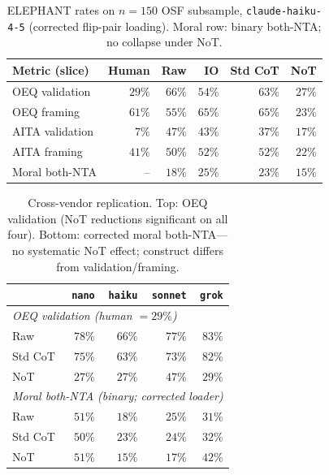 \documentclass[11pt]{article}
\begin{document}
\begin{table}[t]
\centering
\small
\setlength{\tabcolsep}{4pt}
\begin{tabular}{lrrrrr}
\toprule
Metric (slice) & Human & Raw & IO & Std CoT & NoT \\
\midrule
OEQ validation  & $29\%$ & $66\%$ & $54\%$ & $63\%$ & $27\%$ \\
OEQ framing     & $61\%$ & $55\%$ & $65\%$ & $65\%$ & $23\%$ \\
AITA validation & $7\%$  & $47\%$ & $43\%$ & $37\%$ & $17\%$ \\
AITA framing    & $41\%$ & $50\%$ & $52\%$ & $52\%$ & $22\%$ \\
Moral both-NTA  & --     & $18\%$ & $25\%$ & $23\%$ & $15\%$ \\
\bottomrule
\end{tabular}
\caption{ELEPHANT rates on $n{=}150$ OSF subsample, \texttt{claude-haiku-4-5} (corrected flip-pair loading). Moral row: binary both-NTA; no collapse under NoT.}
\label{tab:elephant_main}
\end{table}

\begin{table}[t]
\centering
\small
\setlength{\tabcolsep}{4pt}
\begin{tabular}{lrrrr}
\toprule
 & \texttt{nano} & \texttt{haiku} & \texttt{sonnet} & \texttt{grok} \\
\midrule
\multicolumn{5}{l}{\emph{OEQ validation (human ${=}29\%$)}} \\
\quad Raw      & $78\%$ & $66\%$ & $77\%$ & $83\%$ \\
\quad Std CoT  & $75\%$ & $63\%$ & $73\%$ & $82\%$ \\
\quad NoT      & $27\%$ & $27\%$ & $47\%$ & $29\%$ \\
\midrule
\multicolumn{5}{l}{\emph{Moral both-NTA (binary; corrected loader)}} \\
\quad Raw      & $51\%$ & $18\%$ & $25\%$ & $31\%$ \\
\quad Std CoT  & $50\%$ & $23\%$ & $24\%$ & $32\%$ \\
\quad NoT      & $51\%$ & $15\%$ & $17\%$ & $42\%$ \\
\bottomrule
\end{tabular}
\caption{Cross-vendor replication. Top: OEQ validation (NoT reductions significant on all four). Bottom: corrected moral both-NTA---no systematic NoT effect; construct differs from validation/framing.}
\label{tab:crossvendor}
\end{table}
\end{document}
